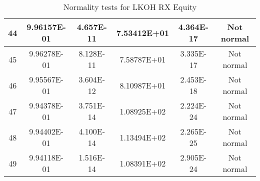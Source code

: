 \begin{table}[h]
\begin{tabular}{|c|c|c|c|c|c|}
		44 & 9.96157E-01 & 4.657E-11 & 7.53412E+01 & 4.364E-17 & Not normal\\\hline
		45 & 9.96278E-01 & 8.128E-11 & 7.58787E+01 & 3.335E-17 & Not normal\\\hline
		46 & 9.95567E-01 & 3.604E-12 & 8.10987E+01 & 2.453E-18 & Not normal\\\hline
		47 & 9.94378E-01 & 3.751E-14 & 1.08925E+02 & 2.224E-24 & Not normal\\\hline
		48 & 9.94402E-01 & 4.100E-14 & 1.13494E+02 & 2.265E-25 & Not normal\\\hline
		49 & 9.94118E-01 & 1.516E-14 & 1.08391E+02 & 2.905E-24 & Not normal\\\hline
	\end{tabular}
	\caption{Normality tests for LKOH RX Equity}
	\label{tab:normality_tests_LKOH_RX}
\end{table}
